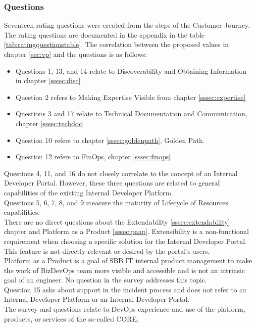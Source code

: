 \documentclass[a4paper,10pt]{article}
\begin{document}
    \subsubsection{Questions}
    \label{sssec:questions}
    Seventeen rating questions were created from the steps of the Customer Journey.
    The rating questions are documented in the appendix in the table \ref{tab:ratingquestionstable}.
    The correlation between the proposed values in chapter \ref{sec:vp} and the questions is as follows:
    \begin{itemize}
        \item Questions 1, 13, and 14 relate to Discoverability and Obtaining Information in chapter \ref{sssec:disc}
        \item Question 2 refers to Making Expertise Visible from chapter \ref{sssec:expertise}
        \item Questions 3 and 17 relate to Technical Documentation and Communication, chapter \ref{sssec:techdoc}
        \item Question 10 refers to chapter \ref{sssec:goldenpath}, Golden Path.
        \item Question 12 refers to FinOps, chapter \ref{sssec:finops}
    \end{itemize}
    Questions 4, 11, and 16 do not closely correlate to the concept of an Internal Developer Portal.
    However, these three questions are related to general capabilities of the existing Internal Developer Platform.\\
    Questions 5, 6, 7, 8, and 9 measure the maturity of Lifecycle of Resources capabilities.\\
    There are no direct questions about the Extendability \ref{sssec:extendability} chapter and Platform as a Product
    \ref{sssec:paap}.
    Extensibility is a non-functional requirement when choosing a specific solution for the Internal Developer Portal.
    This feature is not directly relevant or desired by the portal's users.\\
    Platform as a Product is a goal of SBB IT internal product management to make the work of BizDevOps
    team more visible and accessible and is not an intrinsic goal of an engineer.
    No question in the survey addresses this topic.\\
    Question 15 asks about support in the incident process and does not refer to an Internal Developer Platform or an
    Internal Developer Portal. \\
    The survey and questions relate to DevOps experience and use of the platform, products, or services of the so-called CORE,
\end{document}
